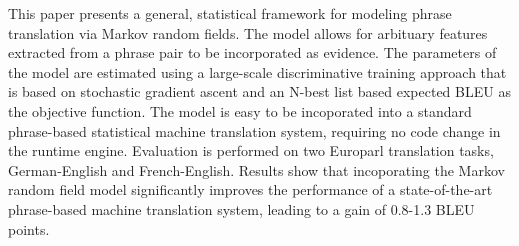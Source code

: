 This paper presents a general, statistical framework for modeling phrase translation via Markov random fields. The model allows for arbituary features
 extracted from a phrase pair to be incorporated as evidence. The parameters of
 the model are estimated using a large-scale discriminative training approach
 that is based on stochastic gradient ascent and an N-best list based expected
 BLEU as the objective function. The model is easy to be incoporated into a
 standard phrase-based statistical machine translation system, requiring no code
 change in the runtime engine. Evaluation is performed on two Europarl
 translation tasks, German-English and French-English. Results show that
 incoporating the Markov random field model significantly improves the
 performance of a state-of-the-art phrase-based machine translation system,
 leading to a gain of  0.8-1.3 BLEU points.


